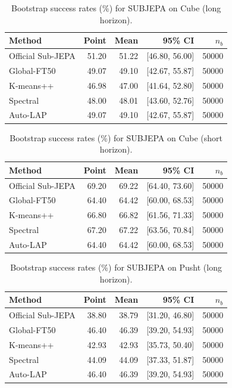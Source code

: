 \begin{table}[t]
\centering
\small
\caption{Bootstrap success rates (\%) for SUBJEPA on Cube (long horizon).}
\begin{tabular}{lrrrr}
\toprule
Method & Point & Mean & 95\% CI & $n_b$ \\
\midrule
Official Sub-JEPA & 51.20 & 51.22 & [46.80, 56.00] & 50000 \\
Global-FT50 & 49.07 & 49.10 & [42.67, 55.87] & 50000 \\
K-means++ & 46.98 & 47.00 & [41.64, 52.80] & 50000 \\
Spectral & 48.00 & 48.01 & [43.60, 52.76] & 50000 \\
Auto-LAP & 49.07 & 49.10 & [42.67, 55.87] & 50000 \\
\bottomrule
\end{tabular}
\end{table}

\begin{table}[t]
\centering
\small
\caption{Bootstrap success rates (\%) for SUBJEPA on Cube (short horizon).}
\begin{tabular}{lrrrr}
\toprule
Method & Point & Mean & 95\% CI & $n_b$ \\
\midrule
Official Sub-JEPA & 69.20 & 69.22 & [64.40, 73.60] & 50000 \\
Global-FT50 & 64.40 & 64.42 & [60.00, 68.53] & 50000 \\
K-means++ & 66.80 & 66.82 & [61.56, 71.33] & 50000 \\
Spectral & 67.20 & 67.22 & [63.56, 70.84] & 50000 \\
Auto-LAP & 64.40 & 64.42 & [60.00, 68.53] & 50000 \\
\bottomrule
\end{tabular}
\end{table}

\begin{table}[t]
\centering
\small
\caption{Bootstrap success rates (\%) for SUBJEPA on Pusht (long horizon).}
\begin{tabular}{lrrrr}
\toprule
Method & Point & Mean & 95\% CI & $n_b$ \\
\midrule
Official Sub-JEPA & 38.80 & 38.79 & [31.20, 46.80] & 50000 \\
Global-FT50 & 46.40 & 46.39 & [39.20, 54.93] & 50000 \\
K-means++ & 42.93 & 42.93 & [35.73, 50.40] & 50000 \\
Spectral & 44.09 & 44.09 & [37.33, 51.87] & 50000 \\
Auto-LAP & 46.40 & 46.39 & [39.20, 54.93] & 50000 \\
\bottomrule
\end{tabular}
\end{table}

